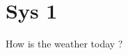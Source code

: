 \documentclass[addpoints,12pt,twoside]{exam} %
\begin{document}
    \author{Shah Rrks}
    \section*{Sys 1}
    \begin{questions}
  
        \question[5]
        How is the weather today ? 
 
    
        
    \end{questions}
\end{document}
